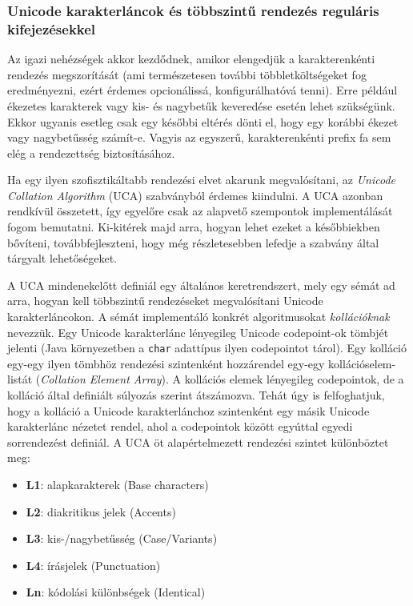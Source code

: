 \documentclass[
    parspace,
    noindent,
    nohyp,
]{elteiktdk}[2023/04/10]
\begin{document}
\subsubsection{Unicode karakterláncok és többszintű rendezés reguláris kifejezésekkel}

Az igazi nehézségek akkor kezdődnek,
amikor elengedjük a karakterenkénti rendezés megszorítását
(ami természetesen további többletköltségeket fog eredményezni,
ezért érdemes opcionálissá, konfigurálhatóvá tenni).
Erre például ékezetes karakterek vagy kis- és nagybetűk keveredése esetén lehet szükségünk.
Ekkor ugyanis esetleg csak egy későbbi eltérés dönti el,
hogy egy korábbi ékezet vagy nagybetűsség számít-e.
Vagyis az egyszerű, karakterenkénti prefix fa sem elég a rendezettség biztosításához.

Ha egy ilyen szofisztikáltabb rendezési elvet akarunk megvalósítani,
az \textit{Unicode Collation Algorithm} (UCA) szabványból érdemes kiindulni\cite{UCA2024}.
A UCA azonban rendkívül összetett,
így egyelőre csak az alapvető szempontok implementálását fogom bemutatni.
Ki-kitérek majd arra, hogyan lehet ezeket a későbbiekben bővíteni, továbbfejleszteni,
hogy még részletesebben lefedje a szabvány által tárgyalt lehetőségeket.

A UCA mindenekelőtt definiál egy általános keretrendszert,
mely egy sémát ad arra, hogyan kell többszintű rendezéseket megvalósítani Unicode karakterláncokon.
A sémát implementáló konkrét algoritmusokat \textit{kollációknak} nevezzük.
Egy Unicode karakterlánc lényegileg Unicode codepoint-ok tömbjét jelenti
(Java környezetben a \texttt{char} adattípus ilyen codepointot tárol).
Egy kolláció egy-egy ilyen tömbhöz rendezési szintenként hozzárendel egy-egy
kollációselem-listát (\textit{Collation Element Array}).
A kollációs elemek lényegileg codepointok, de a kolláció által definiált súlyozás szerint átszámozva.
Tehát úgy is felfoghatjuk, hogy a kolláció a Unicode karakterlánchoz
szintenként egy másik Unicode karakterlánc nézetet rendel,
ahol a codepointok között egyúttal egyedi sorrendezést definiál.
A UCA öt alapértelmezett rendezési szintet különböztet meg:

\begin{itemize}
    \item \textbf{L1}: alapkarakterek (Base characters)
    \item \textbf{L2}: diakritikus jelek (Accents)
    \item \textbf{L3}: kis-/nagybetűsség (Case/Variants)
    \item \textbf{L4}: írásjelek (Punctuation)
    \item \textbf{Ln}: kódolási különbségek (Identical)
\end{itemize}
\end{document}
